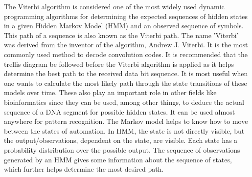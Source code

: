 \documentclass[12pt,journal,compsoc]{IEEEtran}
\begin{document}
% 
% 
% 
% 
The Viterbi algorithm is considered one of the most widely used dynamic programming algorithms for determining the expected sequences of hidden states in a given Hidden Markov Model (HMM) and an observed sequence of symbols. This path of a sequence is also known as the Viterbi path. The name 'Viterbi' was derived from the inventor of the algorithm, Andrew J. Viterbi. It is the most commonly used method to decode convolution codes. It is recommended that the trellis diagram be followed before the Viterbi algorithm is applied as it helps determine the best path to the received data bit sequence. It is most useful when one wants to calculate the most likely path through the state transitions of these models over time. These also play an important role in other fields like bioinformatics since they can be used, among other things, to deduce the actual sequence of a DNA segment for possible hidden states. It can be used almost anywhere for pattern recognition. The Markov model helps to know how to move between the states of automation. In HMM, the state is not directly visible, but the output/observations, dependent on the state, are visible. Each state has a probability distribution over the possible output. The sequence of observations generated by an HMM gives some information about the sequence of states, which further helps determine the most desired path. 
\end{document}
